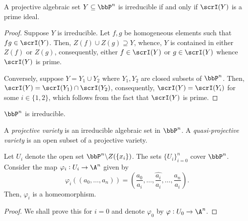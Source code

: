 \begin{proposition}
    A projective algebraic set $Y\subseteq\bbP^n$ is irreducible if and only if $\scrI(Y)$ is a prime ideal.
\end{proposition}
\begin{proof}
    Suppose $Y$ is irreducible. Let $f,g$ be homogeneous elements such that $fg\in\scrI(Y)$. Then, $Z(f)\cup Z(g)\supseteq Y$, whence, $Y$ is contained in either $Z(f)$ or $Z(g)$, consequently, either $f\in\scrI(Y)$ or $g\in\scrI(Y)$ whence $\scrI(Y)$ is prime.

    Conversely, suppose $Y = Y_1\cup Y_2$ where $Y_1, Y_2$ are closed subsets of $\bbP^n$. Then, $\scrI(Y) = \scrI(Y_1)\cap\scrI(Y_2)$, consequently, $\scrI(Y) = \scrI(Y_i)$ for some $i\in\{1,2\}$, which follows from the fact that $\scrI(Y)$ is prime.
\end{proof}

\begin{corollary}
    $\bbP^n$ is irreducible.
\end{corollary}

\begin{definition}
    A \emph{projective variety} is an irreducible algebraic set in $\bbP^n$. A \emph{quasi-projective variety} is an open subset of a projective variety.
\end{definition}

\begin{theorem}
    Let $U_i$ denote the open set $\bbP^n\backslash Z(\{x_i\})$. The sets $\{U_i\}_{i = 0}^n$ cover $\bbP^n$. Consider the map $\varphi_i: U_i\to\A^n$ given by 
    \begin{equation*}
        \varphi_i((a_0,\dots,a_n)) = \left(\frac{a_0}{a_i},\dots,\widehat{\frac{a_i}{a_i}},\dots,\frac{a_n}{a_i}\right).
    \end{equation*}
    Then, $\varphi_i$ is a homeomorphism.
\end{theorem}
\begin{proof}
    We shall prove this for $i = 0$ and denote $\varphi_0$ by $\varphi: U_0\to\A^n$.
\end{proof}

